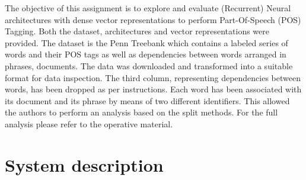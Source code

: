 \documentclass[11pt]{article}
\begin{document}


The objective of this assignment is to explore and evaluate (Recurrent) Neural architectures with dense vector representations to perform Part-Of-Speech (POS) Tagging. Both the dataset, architectures and vector representations were provided. The dataset is the Penn Treebank\cite{Marcus1994} which contains a labeled series of words and their POS tags as well as dependencies between words arranged in phrases, documents. 
The data was downloaded and transformed into a suitable format for data inspection. The third column, representing dependencies between words, has been dropped as per instructions. Each word has been associated with its document and its phrase by means of two different identifiers. This allowed the authors to perform an analysis based on the split methods. For the full analysis please refer to the operative material.




\section{System description}
\label{sec:system}
\end{document}

